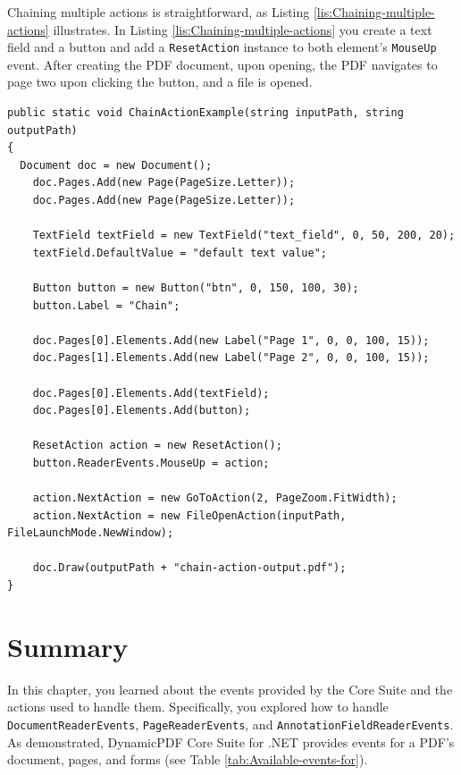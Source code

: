 \documentclass[american,letterpaper]{tufte-book}
\numberwithin{equation}{section}
\numberwithin{figure}{section}
\begin{document}
{{Chaining multiple actions is straightforward, as Listing \ref{lis:Chaining-multiple-actions}
illustrates. In Listing \ref{lis:Chaining-multiple-actions} you create
a text field and a button and add a \texttt{ResetAction} instance
to both element's \texttt{MouseUp} event. After creating the PDF document,
upon opening, the PDF navigates to page two upon clicking the button,
and a file is opened. 

\bgroup{}
\begin{lstlisting}[caption={Chaining multiple actions in a PDF document.},label={lis:Chaining-multiple-actions},basicstyle={\small\ttfamily},breaklines=true]
public static void ChainActionExample(string inputPath, string outputPath)
{
  Document doc = new Document();
    doc.Pages.Add(new Page(PageSize.Letter));
    doc.Pages.Add(new Page(PageSize.Letter));

    TextField textField = new TextField("text_field", 0, 50, 200, 20);
    textField.DefaultValue = "default text value";

    Button button = new Button("btn", 0, 150, 100, 30);
    button.Label = "Chain";

    doc.Pages[0].Elements.Add(new Label("Page 1", 0, 0, 100, 15));
    doc.Pages[1].Elements.Add(new Label("Page 2", 0, 0, 100, 15));

    doc.Pages[0].Elements.Add(textField);
    doc.Pages[0].Elements.Add(button);

    ResetAction action = new ResetAction();
    button.ReaderEvents.MouseUp = action;

    action.NextAction = new GoToAction(2, PageZoom.FitWidth);
    action.NextAction = new FileOpenAction(inputPath, FileLaunchMode.NewWindow);

    doc.Draw(outputPath + "chain-action-output.pdf");
}
\end{lstlisting}
\leavevmode\egroup


\section{Summary}

In this chapter, you learned about the events provided by the Core Suite and the actions used to handle them. Specifically, you explored how to handle \texttt{DocumentReaderEvents}, \texttt{PageReaderEvents}, and \texttt{AnnotationFieldReaderEvents}. As demonstrated, DynamicPDF Core Suite for .NET provides events for a PDF’s document, pages, and forms (see Table \ref{tab:Available-events-for}).

}}
\end{document}
